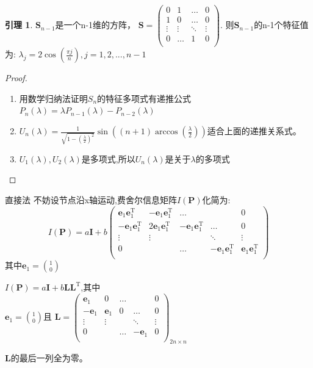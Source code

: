 \documentclass[notheorems,xetex]{beamer}
\theoremstyle{definition}
\newtheorem{lemma}{引理}
\begin{document}
\begin{frame}[noframenumbering]
\begin{lemma}\label{lemma:special}
$\bm{S}_{n-1}$是一个n-1维的方阵，
$\bm{S}=\left(
\begin{array}{cccc}
0&1&\dots&0\\
1&0&\dots&0\\
\vdots&\vdots&\ddots&\vdots\\
0&\dots&1&0\\
\end{array}\right).$
则$\bm{S}_{n-1}$的n-1个特征值为:
$\lambda_j=2\cos(\frac{\pi j}{n}),j=1,2,...,n-1$
\end{lemma}
\begin{proof}
\begin{enumerate}
  \item 用数学归纳法证明$S_n$的特征多项式有递推公式$P_n(\lambda)=\lambda P_{n-1}(\lambda)-P_{n-2}(\lambda)$
  \item $U_n(\lambda)=\frac{1}{\sqrt{1-(\frac{\lambda}{2})^2}}\sin((n+1)\arccos(\frac{\lambda}{2}))$适合上面的递推关系式。
  \item $U_1(\lambda),U_2(\lambda)$是多项式,所以$U_n(\lambda)$是关于$\lambda$的多项式
\end{enumerate}
\end{proof}
\end{frame}
\begin{frame}[noframenumbering]{直接法}
不妨设节点沿x轴运动,费舍尔信息矩阵$I(\bm{P})$化简为:
\begin{equation*}
I(\bm{P})=a\bm{I}+b \left(
\begin{array}{ccccc}
\bm{e}_1\bm{e}_1^{\textrm{T}}&-\bm{e}_1\bm{e}_1^{\textrm{T}}&\dots&&0\\
-\bm{e}_1\bm{e}_1^{\textrm{T}}&2\bm{e}_1\bm{e}_1^{\textrm{T}}&-\bm{e}_1\bm{e}_1^{\textrm{T}}&\dots&0\\
\vdots &\vdots&&\ddots &\vdots\\
0&&\dots&-\bm{e}_1\bm{e}_1^{\textrm{T}}&\bm{e}_1\bm{e}_1^{\textrm{T}}\\
\end{array}
\right)
\end{equation*}
其中$\bm{e}_1=\binom{1}{0}$
\end{frame}
\begin{frame}[noframenumbering]
$I(\bm{P})=a\bm{I}+b \bm{L}\bm{L}^{\textrm{T}}$,其中\\

\bigskip
$\bm{e}_1=\binom{1}{0}$且
$\bm{L}=\left(\begin{array}{ccccc}
\bm{e}_1&0&\dots&&0\\
-\bm{e}_1&\bm{e}_1&0&\dots&0\\
\vdots &\vdots&&\ddots &\vdots\\
0&&\dots&-\bm{e}_1&0\\
\end{array}
\right)_{2n\times n}$
\bigskip

$\bm{L}$的最后一列全为零。
\end{frame}
\end{document}
